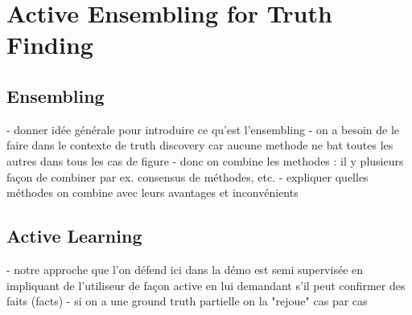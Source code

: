 \section{Active Ensembling for Truth Finding}

\subsection{Ensembling }
- donner idée générale pour introduire  ce qu'est l'ensembling
- on a besoin de le faire dans le contexte de truth discovery car aucune methode ne bat toutes les autres dans tous les cas de figure
- donc on combine les methodes : il y plusieurs façon de combiner par ex. consensus de méthodes, etc.
- expliquer quelles méthodes on combine avec leurs avantages et inconvénients

\subsection{Active Learning }
- notre approche que l'on défend ici dans la démo est  semi supervisée en impliquant de l'utiliseur de façon active
en lui demandant s'il peut confirmer des faits (facts)
- si on a une ground truth partielle on la "rejoue" cas par cas

